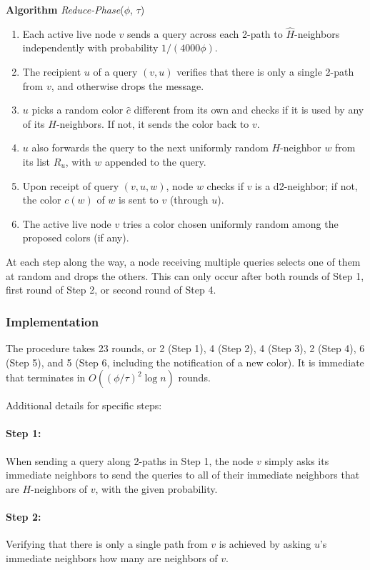    \textbf{Algorithm} \emph{Reduce-Phase}($\phi$, $\tau$)
\begin{enumerate}
\itemsep 0em 
  \item Each active live node $v$ sends a query across each 2-path to $\hat{H}$-neighbors independently with probability $1/(4000\phi)$.
  \item The recipient $u$ of a query $(v,u)$ verifies that there is only a single 2-path from $v$, and otherwise drops the message.
  \item $u$ picks a random color $\hat{c}$ different from its own and checks if it is used by any of its $H$-neighbors. If not, it sends the color back to $v$.
  \item $u$ also forwards the query to the next uniformly random $H$-neighbor $w$ from its list $R_u$, with $w$ appended to the query. %
  \item Upon receipt of query $(v,u,w)$, node $w$ checks if $v$ is a d2-neighbor; if not, the color $c(w)$ of $w$ is sent to $v$ (through $u$).
  \item The active live node $v$ tries a color chosen uniformly random among the proposed colors (if any).
  \end{enumerate}
At each step along the way, a node receiving multiple queries selects one of them at random and drops the others. This can only occur after both rounds of Step 1, first round of Step 2, or second round of Step 4.

\subsubsection{Implementation}
The procedure  takes 23 rounds, or 2 (Step 1), 4 (Step 2), 4 (Step 3), 2 (Step 4), 6 (Step 5), and 5 (Step 6, including the notification of a new color). It is immediate that  terminates in $O((\phi/\tau)^2 \log n)$ rounds.



Additional details for specific steps:
\paragraph{Step 1:}
When sending a query along 2-paths in Step 1, the node $v$ simply asks its immediate neighbors to send the queries to all of their immediate neighbors that are $H$-neighbors of $v$, with the given probability.
\paragraph{Step 2:}
Verifying that there is only a single path from $v$ is achieved by asking $u$'s immediate neighbors how many are neighbors of $v$. 

